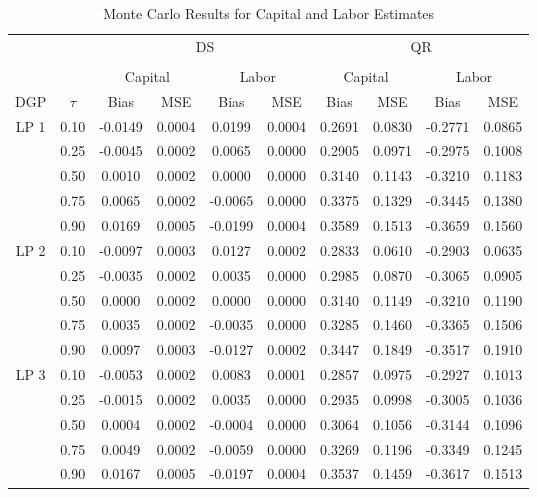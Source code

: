 \documentclass[11pt]{article}
\begin{document}
\begin{table}[H]
\centering
\caption{Monte Carlo Results for Capital and Labor Estimates}
\begin{tabular}{cccccccccc}
  \hline\hline & & & \multicolumn{2}{c}{DS} & & & \multicolumn{2}{c}{QR} \\ \cmidrule(lr){3-6} \cmidrule(lr){7-10} \\ & & \multicolumn{2}{c}{Capital} & \multicolumn{2}{c}{Labor} & \multicolumn{2}{c}{Capital} & \multicolumn{2}{c}{Labor} \\ \cmidrule(lr){3-4} \cmidrule(lr){5-6} \cmidrule(lr){7-8} \cmidrule(lr){9-10}DGP & $\tau$ & Bias & MSE & Bias & MSE & Bias & MSE & Bias & MSE \\ 
  \hline
LP 1 & 0.10 & -0.0149 & 0.0004 & 0.0199 & 0.0004 & 0.2691 & 0.0830 & -0.2771 & 0.0865 \\ 
   & 0.25 & -0.0045 & 0.0002 & 0.0065 & 0.0000 & 0.2905 & 0.0971 & -0.2975 & 0.1008 \\ 
   & 0.50 & 0.0010 & 0.0002 & 0.0000 & 0.0000 & 0.3140 & 0.1143 & -0.3210 & 0.1183 \\ 
   & 0.75 & 0.0065 & 0.0002 & -0.0065 & 0.0000 & 0.3375 & 0.1329 & -0.3445 & 0.1380 \\ 
   & 0.90 & 0.0169 & 0.0005 & -0.0199 & 0.0004 & 0.3589 & 0.1513 & -0.3659 & 0.1560 \\ 
  LP 2 & 0.10 & -0.0097 & 0.0003 & 0.0127 & 0.0002 & 0.2833 & 0.0610 & -0.2903 & 0.0635 \\ 
   & 0.25 & -0.0035 & 0.0002 & 0.0035 & 0.0000 & 0.2985 & 0.0870 & -0.3065 & 0.0905 \\ 
   & 0.50 & 0.0000 & 0.0002 & 0.0000 & 0.0000 & 0.3140 & 0.1149 & -0.3210 & 0.1190 \\ 
   & 0.75 & 0.0035 & 0.0002 & -0.0035 & 0.0000 & 0.3285 & 0.1460 & -0.3365 & 0.1506 \\ 
   & 0.90 & 0.0097 & 0.0003 & -0.0127 & 0.0002 & 0.3447 & 0.1849 & -0.3517 & 0.1910 \\ 
  LP 3 & 0.10 & -0.0053 & 0.0002 & 0.0083 & 0.0001 & 0.2857 & 0.0975 & -0.2927 & 0.1013 \\ 
   & 0.25 & -0.0015 & 0.0002 & 0.0035 & 0.0000 & 0.2935 & 0.0998 & -0.3005 & 0.1036 \\ 
   & 0.50 & 0.0004 & 0.0002 & -0.0004 & 0.0000 & 0.3064 & 0.1056 & -0.3144 & 0.1096 \\ 
   & 0.75 & 0.0049 & 0.0002 & -0.0059 & 0.0000 & 0.3269 & 0.1196 & -0.3349 & 0.1245 \\ 
   & 0.90 & 0.0167 & 0.0005 & -0.0197 & 0.0004 & 0.3537 & 0.1459 & -0.3617 & 0.1513 \\ 

\end{tabular}
\end{table}
\end{document}
